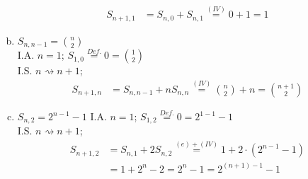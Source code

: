 \documentclass[11pt,a4paper,ngerman]{article}
\begin{document}
\begin{enumerate}[a)]
\begin{equation*}
\begin{split}
    S_{n+1,1} &= S_{n,0} + S_{n,1} \stackrel{(IV)}{=}0 + 1 = 1\end{split}\end{equation*}
\item $S_{n,n-1} = \binom{n}{2}$ \\
I.A. $n=1$; $S_{1,0} \stackrel{Def.}{=} 0 = \binom{1}{2} $ \\
I.S. $n \rightsquigarrow n+1$;
  \begin{equation*}\begin{split}
    S_{n+1,n} &= S_{n,n-1} + n S_{n,n} \stackrel{(IV)}{=} \binom{n}{2} + n = \binom{n+1}{2}
  \end{split}\end{equation*}
\item $S_{n,2} = 2^{n-1} -1 $
I.A. $n=1$; $S_{1,2} \stackrel{Def.}{=} 0 = 2^{1-1} - 1 $ \\
I.S. $n \rightsquigarrow n+1$;
  \begin{equation*}\begin{split}
    S_{n+1,2} &= S_{n,1} + 2 S_{n,2} \stackrel{(e)+(IV)}{=} 1 + 2\cdot (2^{n-1} -1) \\
              &= 1+ 2^n - 2 = 2^n - 1 = 2^{(n+1)-1} - 1
  \end{split}\end{equation*}

\end{enumerate}

\label{LastPage}
\end{document}
